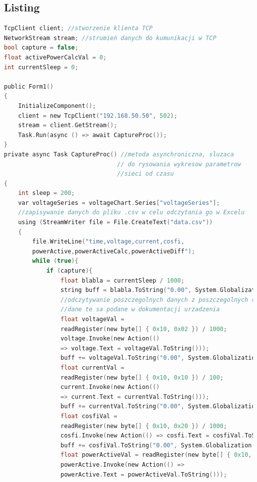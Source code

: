 \documentclass[12pt]{article}
\begin{document}
\subsection{Listing}
\begin{lstlisting}[language=c]
TcpClient client; //stworzenie klienta TCP
NetworkStream stream; //strumień danych do kumunikacji w TCP
bool capture = false;
float activePowerCalcVal = 0;
int currentSleep = 0;

public Form1()
{
    InitializeComponent();
    client = new TcpClient("192.168.50.50", 502);
    stream = client.GetStream();
    Task.Run(async () => await CaptureProc());
}
private async Task CaptureProc() //metoda asynchroniczna, sluzaca
                                // do rysowania wykresow parametrow
                                //sieci od czasu
{
    int sleep = 200;
    var voltageSeries = voltageChart.Series["voltageSeries"];
    //zapisywanie danych do pliku .csv w celu odczytania go w Excelu
    using (StreamWriter file = File.CreateText("data.csv"))
    {
        file.WriteLine("time,voltage,current,cosfi,
        powerActive,powerActiveCalc,powerActiveDiff");
        while (true){
            if (capture){
                float blabla = currentSleep / 1000;
                string buff = blabla.ToString("0.00", System.Globalization.CultureInfo.InvariantCulture);
                //odczytywanie poszczegolnych danych z poszczegolnych rejestrow
                //dane te sa podane w dokumentacji urzadzenia
                float voltageVal = 
                readRegister(new byte[] { 0x10, 0x02 }) / 1000;
                voltage.Invoke(new Action(()
                => voltage.Text = voltageVal.ToString()));
                buff += voltageVal.ToString("0.00", System.Globalization.CultureInfo.InvariantCulture) + ",";
                float currentVal = 
                readRegister(new byte[] { 0x10, 0x10 }) / 100;
                current.Invoke(new Action(() 
                => current.Text = currentVal.ToString()));
                buff += currentVal.ToString("0.00", System.Globalization.CultureInfo.InvariantCulture) + ",";
                float cosfiVal = 
                readRegister(new byte[] { 0x10, 0x20 }) / 1000;
                cosfi.Invoke(new Action(() => cosfi.Text = cosfiVal.ToString()));
                buff += cosfiVal.ToString("0.00", System.Globalization.CultureInfo.InvariantCulture) + ",";
                float powerActiveVal = readRegister(new byte[] { 0x10, 0x30 });
                powerActive.Invoke(new Action(() => 
                powerActive.Text = powerActiveVal.ToString()));

\end{lstlisting}
\end{document}
